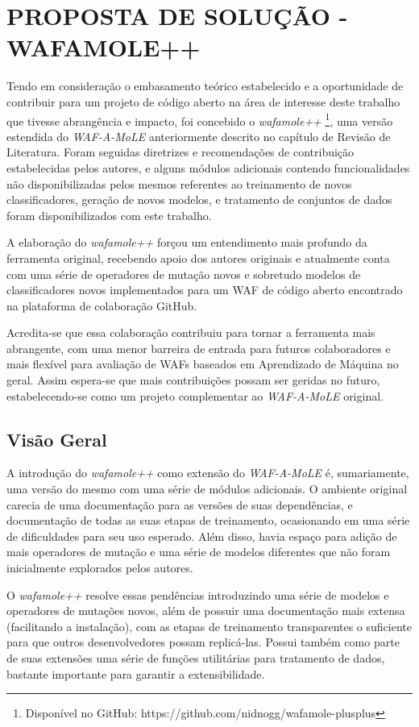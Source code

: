 \chapter{PROPOSTA DE SOLUÇÃO - WAFAMOLE++}
\label{chp:capitulo4}

Tendo em consideração o embasamento teórico estabelecido e a oportunidade de contribuir para um projeto de código aberto na área de interesse deste trabalho que tivesse abrangência e impacto, foi concebido o \textit{wafamole++} \footnote{Disponível no GitHub: https://github.com/nidnogg/wafamole-plusplus}, uma versão estendida do \textit{WAF-A-MoLE} anteriormente descrito no capítulo de Revisão de Literatura. Foram seguidas diretrizes e recomendações de contribuição estabelecidas pelos autores, e alguns módulos adicionais contendo funcionalidades não disponibilizadas pelos mesmos referentes ao treinamento de novos classificadores, geração de novos modelos, e tratamento de conjuntos de dados foram disponibilizados com este trabalho.

A elaboração do \textit{wafamole++} forçou um entendimento mais profundo da ferramenta original, recebendo apoio dos autores originais e atualmente conta com uma série de operadores de mutação novos e sobretudo modelos de classificadores novos implementados para um WAF de código aberto encontrado na plataforma de colaboração GitHub.

Acredita-se que essa colaboração contribuiu para tornar a ferramenta mais abrangente, com uma menor barreira de entrada para futuros colaboradores e mais flexível para avaliação de WAFs baseados em Aprendizado de Máquina no geral. Assim espera-se que mais contribuições possam ser geridas no futuro, estabelecendo-se como um projeto complementar ao \textit{WAF-A-MoLE} original.

\section{Visão Geral}
A introdução do \textit{wafamole++} como extensão do \textit{WAF-A-MoLE} é, sumariamente, uma versão do mesmo com uma série de módulos adicionais. O ambiente original carecia de uma documentação para as versões de suas dependências, e documentação de todas as suas etapas de treinamento, ocasionando em uma série de dificuldades para seu uso esperado. Além disso, havia espaço para adição de mais operadores de mutação e uma série de modelos diferentes que não foram inicialmente explorados pelos autores.

O \textit{wafamole++} resolve essas pendências introduzindo uma série de modelos e operadores de mutações novos, além de possuir uma documentação mais extensa (facilitando a instalação), com as etapas de treinamento transparentes o suficiente para que outros desenvolvedores possam replicá-las. Possui também como parte de suas extensões uma série de funções utilitárias para tratamento de dados, bastante importante para garantir a extensibilidade. 

